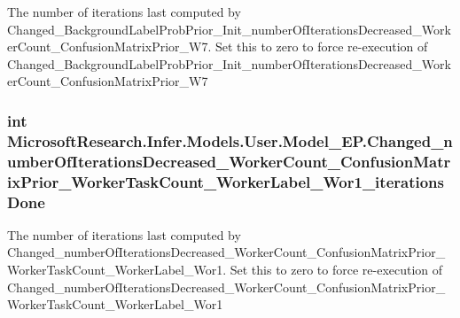 The number of iterations last computed by Changed\+\_\+\+Background\+Label\+Prob\+Prior\+\_\+\+Init\+\_\+number\+Of\+Iterations\+Decreased\+\_\+\+Worker\+Count\+\_\+\+Confusion\+Matrix\+Prior\+\_\+\+W7. Set this to zero to force re-\/execution of Changed\+\_\+\+Background\+Label\+Prob\+Prior\+\_\+\+Init\+\_\+number\+Of\+Iterations\+Decreased\+\_\+\+Worker\+Count\+\_\+\+Confusion\+Matrix\+Prior\+\_\+\+W7

\hypertarget{class_microsoft_research_1_1_infer_1_1_models_1_1_user_1_1_model___e_p_a6ba5341acb834c6b1b7afc6f339bc210}{}
\subsubsection[{Changed\+\_\+number\+Of\+Iterations\+Decreased\+\_\+\+Worker\+Count\+\_\+\+Confusion\+Matrix\+Prior\+\_\+\+Worker\+Task\+Count\+\_\+\+Worker\+Label\+\_\+\+Wor1\+\_\+iterations\+Done}]{\setlength{\rightskip}{0pt plus 5cm}int Microsoft\+Research.\+Infer.\+Models.\+User.\+Model\+\_\+\+E\+P.\+Changed\+\_\+number\+Of\+Iterations\+Decreased\+\_\+\+Worker\+Count\+\_\+\+Confusion\+Matrix\+Prior\+\_\+\+Worker\+Task\+Count\+\_\+\+Worker\+Label\+\_\+\+Wor1\+\_\+iterations\+Done}\label{class_microsoft_research_1_1_infer_1_1_models_1_1_user_1_1_model___e_p_a6ba5341acb834c6b1b7afc6f339bc210}


The number of iterations last computed by Changed\+\_\+number\+Of\+Iterations\+Decreased\+\_\+\+Worker\+Count\+\_\+\+Confusion\+Matrix\+Prior\+\_\+\+Worker\+Task\+Count\+\_\+\+Worker\+Label\+\_\+\+Wor1. Set this to zero to force re-\/execution of Changed\+\_\+number\+Of\+Iterations\+Decreased\+\_\+\+Worker\+Count\+\_\+\+Confusion\+Matrix\+Prior\+\_\+\+Worker\+Task\+Count\+\_\+\+Worker\+Label\+\_\+\+Wor1

